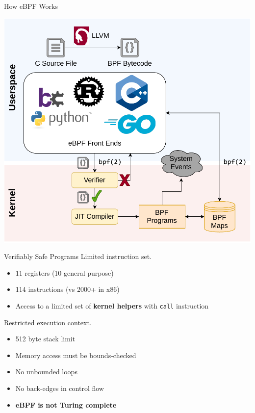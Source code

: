 \documentclass[12pt, dvipsnames, aspectratio=169]{beamer}
\begin{document}
\begin{frame}[c]{How eBPF Works}
\begin{center}
    \color{black}
    \includegraphics[height=0.8\textheight]{figs/how-ebpf-works.pdf}
\end{center}
\end{frame}

\begin{frame}[c]{Verifiably Safe Programs}
Limited instruction set.
\begin{itemize}
    \item 11 registers (10 general purpose)
    \item 114 instructions (vs 2000+ in x86)
    \item Access to a limited set of \textbf{kernel helpers} with \texttt{call} instruction
\end{itemize}
\vfill
Restricted execution context.
\begin{itemize}
    \item 512 byte stack limit
    \item Memory access must be bounds-checked
    \item No unbounded loops
    \item No back-edges in control flow
    \item \textbf{eBPF is not Turing complete}
\end{itemize}
\end{frame}
\end{document}
